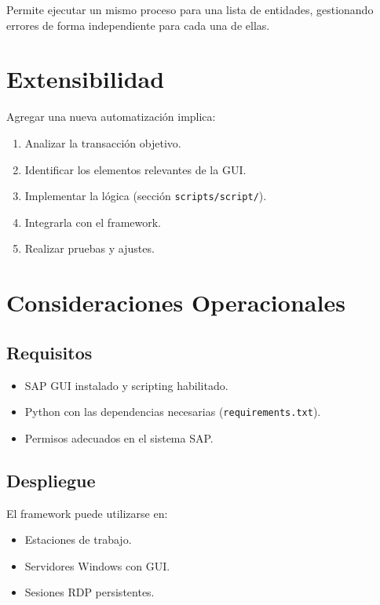 \documentclass[11pt,a4paper]{article}
\begin{document}
Permite ejecutar un mismo proceso para una lista de entidades, gestionando errores de forma independiente para cada una de ellas.


\section{Extensibilidad}

Agregar una nueva automatización implica:

\begin{enumerate}
    \item Analizar la transacción objetivo.
    \item Identificar los elementos relevantes de la GUI.
    \item Implementar la lógica (sección \texttt{scripts/script/}).
    \item Integrarla con el framework.
    \item Realizar pruebas y ajustes.
\end{enumerate}


\section{Consideraciones Operacionales}

\subsection{Requisitos}

\begin{itemize}
    \item SAP GUI instalado y scripting habilitado.
    \item Python con las dependencias necesarias (\texttt{requirements.txt}).
    \item Permisos adecuados en el sistema SAP.
\end{itemize}

\subsection{Despliegue}

El framework puede utilizarse en:

\begin{itemize}
    \item Estaciones de trabajo.
    \item Servidores Windows con GUI.
    \item Sesiones RDP persistentes.
\end{itemize}
\end{document}
